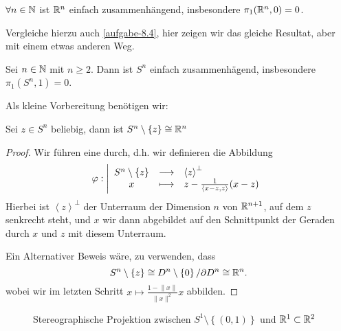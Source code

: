 \begin{theorem}\label{thm:r^n-einfach-zusammenhängend}
    $\forall n\in \mathbb{N}$ ist $\mathbb{R}^n$ einfach zusammenhängend, insbesondere $\pi_1(\mathbb{R}^n,0) = 0$.
\end{theorem}

\begin{remark*}
    Vergleiche hierzu auch  \autoref{aufgabe-8.4}, hier zeigen wir das gleiche Resultat, aber mit einem etwas anderen Weg.
\end{remark*}

\begin{theorem}\label{thm:s^n-einfach-zusammenhängend-wenn-n-geq-2}
    Sei $n\in \mathbb{N}$ mit $n\geq 2$. Dann ist $S^n$ einfach zusammenhägend, insbesondere $\pi_1(S^n,1) = 0$. 
\end{theorem}

Als kleine Vorbereitung benötigen wir:

\begin{lemma*}\label{lm :s^n-ohne-punkt-ist-r^n}
Sei $z\in S^n$ beliebig, dann ist $S^n \setminus \left \{z\right\} \cong\mathbb{R}^n$
\end{lemma*}

\begin{proof}
    Wir führen eine  durch, d.h. wir definieren die Abbildung
        \begin{equation*}
        \varphi : \left| \begin{array}{c c l} 
        S^n \setminus \left \{z\right\}  & \longrightarrow & \left< z \right> ^{\bot} \\
        x & \longmapsto &  z - \frac{1}{\left< x-z,z \right> }(x-z)
        \end{array} \right.
    \end{equation*}
Hierbei ist $\left< z \right> ^{\bot}$ der Unterraum der Dimension $n$ von  $\mathbb{R}^{n+1}$, auf dem $z$ senkrecht steht, und $x$ wir dann abgebildet auf den Schnittpunkt der Geraden durch  $x$ und  $z$ mit diesem Unterraum.

    Ein Alternativer Beweis wäre, zu verwenden, dass
    \[
    S^n \setminus \left \{z\right\} \cong D^n \setminus \left \{0\right\} / \partial D^n \cong  \mathbb{R}^n
    .\] 
    wobei wir im letzten Schritt $x \mapsto  \frac{1-\lVert x \rVert }{\lVert x \rVert^2 }x$ abbilden.
\end{proof}

\begin{figure}[ht]
    \centering
    \caption{Stereographische Projektion zwischen $S^1\setminus \left \{(0,1)\right\} $ und $\mathbb{R}^1\subset \mathbb{R}^2$}
    \label{fig:stereographische-projektion}
\end{figure}

